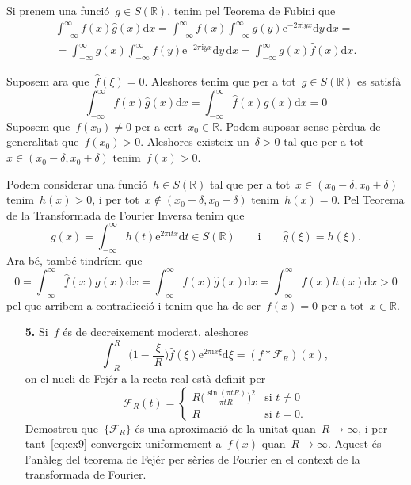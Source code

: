 \documentclass[a4paper]{article}
\theoremstyle{definition}
\newcommand{\iu}{\mathrm{i}}
\newcommand{\e}{\mathrm{e}}
\providecommand{\uppi}{\pi}
\newcommand{\diff}{\mathrm{d}}
\newcommand{\abs}[1]{\lvert{#1}\rvert}
\newcommand{\F}{\mathcal{F}}
\newcommand{\conv}{\mathop{\ast}}
\begin{document}
Si prenem una funció~\(g\in S(\mathbb{R})\), tenim pel Teorema de Fubini que
\begin{multline*}
    \int_{-\infty}^{\infty} f(x)\widehat{g}(x) \diff x
    = \int_{-\infty}^{\infty} f(x)
    \int_{-\infty}^{\infty} g(y) \e^{-2\uppi\iu yx} \diff y\, \diff x = \\
    = \int_{-\infty}^{\infty} g(x)
    \int_{-\infty}^{\infty} f(y) \e^{-2\uppi\iu yx} \diff y\, \diff x
    = \int_{-\infty}^{\infty} g(x)\widehat{f}(x) \diff x.
\end{multline*}

Suposem ara que~\(\widehat{f}(\xi) = 0\).
Aleshores tenim que per a tot~\(g\in S(\mathbb{R})\) es satisfà
\[
    \int_{-\infty}^{\infty} f(x)\widehat{g}(x) \diff x
    = \int_{-\infty}^{\infty} \widehat{f}(x) g(x) \diff x
    = 0
\]
Suposem que~\(f(x_{0}) \neq 0\) per a cert~\(x_{0}\in\mathbb{R}\).
Podem suposar sense pèrdua de generalitat que~\(f(x_{0}) > 0\).
Aleshores existeix un~\(\delta>0\) tal que per a
tot~\(x\in(x_{0}-\delta,x_{0}+\delta)\) tenim~\(f(x) > 0\).

Podem considerar una funció~\(h\in S(\mathbb{R})\) tal que per a
tot~\(x\in(x_{0}-\delta,x_{0}+\delta)\) tenim~\(h(x) > 0\), i per
tot~\(x\notin(x_{0}-\delta,x_{0}+\delta)\) tenim~\(h(x) = 0\).
Pel Teorema de la Transformada de Fourier Inversa tenim que
\[
    g(x)=\int_{-\infty}^{\infty}h(t)\e^{2\uppi\iu tx}\diff t\in S(\mathbb{R})
    \qquad\text{i}\qquad
    \widehat{g}(\xi) = h(\xi).
\]
Ara bé, també tindríem que
\[
    0
    = \int_{-\infty}^{\infty} \widehat{f}(x) g(x) \diff x
    = \int_{-\infty}^{\infty} f(x)\widehat{g}(x) \diff x
    = \int_{-\infty}^{\infty} f(x)h(x) \diff x
    > 0
\]
pel que arribem a contradicció i tenim que ha de ser~\(f(x) = 0\) per a
tot~\(x\in\mathbb{R}\).

\clearpage
\begin{enumerate}
    \item[\textbf{5.}] Si~\(f\) és de decreixement moderat, aleshores
        \begin{equation}
            \label{eq:ex9}
            \int_{-R}^{R}\biggl(1 - \frac{\abs{\xi}}{R}\biggr)
            \widehat{f}(\xi)\e^{2\uppi\iu x\xi}\diff\xi
            = (f\conv\F_{R})(x),
        \end{equation}
        on el nucli de Fejér a la recta real està definit per
        \[
            \F_{R}(t) = \begin{cases}\displaystyle
                R\biggl(\frac{\sin(\uppi tR)}{\uppi tR}\biggr)^{2}
                & \text{si } t \neq 0 \\
                R & \text{si } t = 0.
            \end{cases}
        \]
        Demostreu que~\(\{\F_{R}\}\) és una aproximació de la unitat
        quan~\(R\to\infty\), i per tant~\ref{eq:ex9} convergeix uniformement
        a~\(f(x)\) quan~\(R\to\infty\).
        Aquest és l'anàleg del teorema de Fejér per sèries de Fourier en el
        context de la transformada de Fourier.
\end{enumerate}
\end{document}

